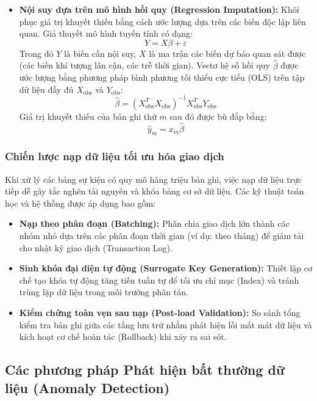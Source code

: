 \documentclass[12pt,a4paper]{article}
\begin{document}
\begin{itemize}
    \item \textbf{Nội suy dựa trên mô hình hồi quy (Regression Imputation):} Khôi phục giá trị khuyết thiếu bằng cách ước lượng dựa trên các biến độc lập liên quan. Giả thuyết mô hình tuyến tính có dạng:
    \begin{equation}
        Y = X\beta + \varepsilon
    \end{equation}
    Trong đó $Y$ là biến cần nội suy, $X$ là ma trận các biến dự báo quan sát được (các biến khí tượng lân cận, các trễ thời gian). Vectơ hệ số hồi quy $\hat{\beta}$ được ước lượng bằng phương pháp bình phương tối thiểu cực tiểu (OLS) trên tập dữ liệu đầy đủ $X_{\text{obs}}$ và $Y_{\text{obs}}$:
    \begin{equation}
        \hat{\beta} = (X_{\text{obs}}^T X_{\text{obs}})^{-1} X_{\text{obs}}^T Y_{\text{obs}}
    \end{equation}
    Giá trị khuyết thiếu của bản ghi thứ $m$ sau đó được bù đắp bằng:
    \begin{equation}
        \hat{y}_m = x_m \hat{\beta}
    \end{equation}
\end{itemize}

\subsubsection{Chiến lược nạp dữ liệu tối ưu hóa giao dịch}
Khi xử lý các bảng sự kiện có quy mô hàng triệu bản ghi, việc nạp dữ liệu trực tiếp dễ gây tắc nghẽn tài nguyên và khóa bảng cơ sở dữ liệu. Các kỹ thuật toán học và hệ thống được áp dụng bao gồm:
\begin{itemize}
    \item \textbf{Nạp theo phân đoạn (Batching):} Phân chia giao dịch lớn thành các nhóm nhỏ dựa trên các phân đoạn thời gian (ví dụ: theo tháng) để giảm tải cho nhật ký giao dịch (Transaction Log).
    \item \textbf{Sinh khóa đại diện tự động (Surrogate Key Generation):} Thiết lập cơ chế tạo khóa tự động tăng tiến tuần tự để tối ưu chỉ mục (Index) và tránh trùng lặp dữ liệu trong môi trường phân tán.
    \item \textbf{Kiểm chứng toàn vẹn sau nạp (Post-load Validation):} So sánh tổng kiểm tra bản ghi giữa các tầng lưu trữ nhằm phát hiện lỗi mất mát dữ liệu và kích hoạt cơ chế hoàn tác (Rollback) khi xảy ra sai sót.
\end{itemize}

\subsection{Các phương pháp Phát hiện bất thường dữ liệu (Anomaly Detection)}
\label{sec:anomaly_theory}
\end{document}
